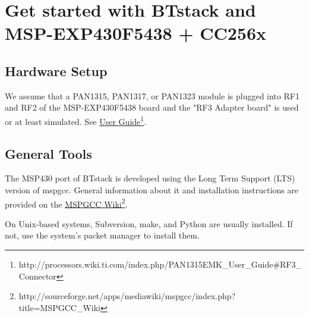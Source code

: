 \newcommand{\urlfoot}[2]{\href{#1}{{\color{blue} #2}}\footnote{#1}}

\newcommand{\UserGuide}{\urlfoot{http://processors.wiki.ti.com/index.php/PAN1315EMK\_User\_Guide\#RF3\_Connector}{User Guide}{}}
\newcommand{\MSPGCCWiki}{\urlfoot{http://sourceforge.net/apps/mediawiki/mspgcc/index.php?title=MSPGCC\_Wiki}{MSPGCC Wiki}}
\newcommand{\Subversion}{\urlfoot{http://www.sliksvn.com/en/download}{Subversion}}
\newcommand{\Tortoise}{\urlfoot{http://tortoisesvn.net/downloads.html}{Tortoise SVN}}
\newcommand{\GNUMake}{\urlfoot{http://gnuwin32.sourceforge.net/packages/make.htm}{GNU Make}}
\newcommand{\Python}{\urlfoot{http://www.python.org/getit/}{Python}}
\newcommand{\mspgcc}{\urlfoot{http://sourceforge.net/projects/mspgcc/files/Windows/mingw32/}{mspgcc}}
\newcommand{\BTSfile}{\urlfoot{http://processors.wiki.ti.com/index.php/CC256x\_Downloads}{BTS file}}
\newcommand{\MSPFlasher}{\urlfoot{http://processors.wiki.ti.com/index.php/MSP430\_Flasher\_-\_Command\_Line\_Programmer}{MSP430Flasher software}}
\newcommand{\MSPDebug}{\urlfoot{http://mspdebug.sourceforge.net/}{MSPDebug}}

\section{Get started with BTstack and MSP-EXP430F5438 + CC256x}

\subsection{Hardware Setup}
We assume that a PAN1315, PAN1317, or PAN1323 module is plugged into RF1 and RF2 of the MSP-EXP430F5438 board and the "RF3 Adapter board" is used or at least simulated. See \UserGuide{}. 

\subsection{General Tools}

The MSP430 port of BTstack is developed using the Long Term Support (LTS) version of mspgcc. General information about it and installation instructions are provided on the \MSPGCCWiki{}.

On Unix-based systems, Subversion, make, and Python are usually installed. If not, use the system's packet manager to install them. 

